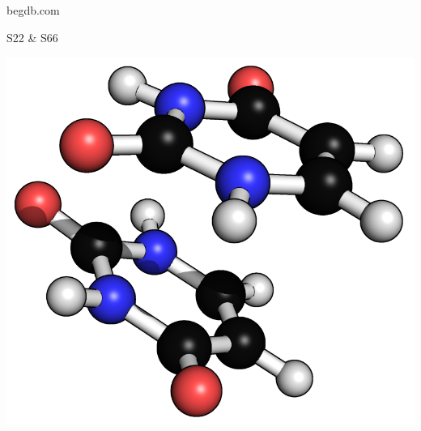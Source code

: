 \begin{frame}[fragile]
\begin{minipage}[t]{0.65\textwidth}
{\begin{tabular}{ @{} l r r r r @{} }
            \end{tabular}

            }

    \end{minipage}
    \begin{minipage}[c]{0.33\textwidth}

            \centering

            {
                begdb.com

                S22 \& S66
            }
    
            \bigskip

            {

            \includegraphics[width=1.0\linewidth]{images/s22_13.png}
 
            }

    \end{minipage}
\end{frame}


